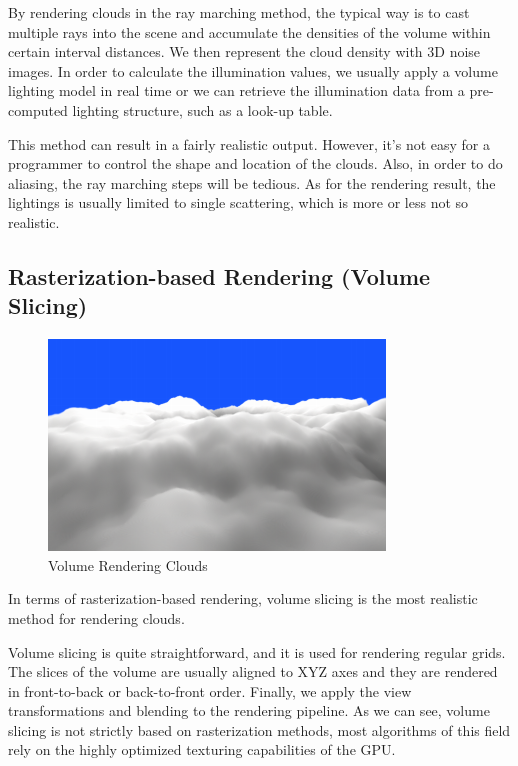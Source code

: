 By rendering clouds in the ray marching method, the typical way is to cast multiple rays into the scene and accumulate the densities of the volume within certain interval distances. We then represent the cloud density with 3D noise images. In order to calculate the illumination values, we usually apply a volume lighting model in real time or we can retrieve the illumination data from a pre-computed lighting structure, such as a look-up table.

This method can result in a fairly realistic output. However, it's not easy for a programmer to control the shape and location of the clouds. Also, in order to do aliasing, the ray marching steps will be tedious. As for the rendering result, the lightings is usually limited to single scattering, which is more or less not so realistic.

\subsection{Rasterization-based Rendering (Volume Slicing)}

\begin{figure}[htp]
\begin{center}
\includegraphics[scale=1.0]{images/volumerendering.png}
\caption{Volume Rendering Clouds}
\label{f4}
\end{center}
\end{figure}

In terms of rasterization-based rendering, volume slicing is the most realistic method for rendering clouds.

Volume slicing is quite straightforward, and it is used for rendering regular grids. The slices of the volume are usually aligned to XYZ axes and they are rendered in front-to-back or back-to-front order. Finally, we apply the view transformations and blending to the rendering pipeline. As we can see, volume slicing is not strictly based on rasterization methods, most algorithms of this field rely on the highly optimized texturing capabilities of the GPU.

